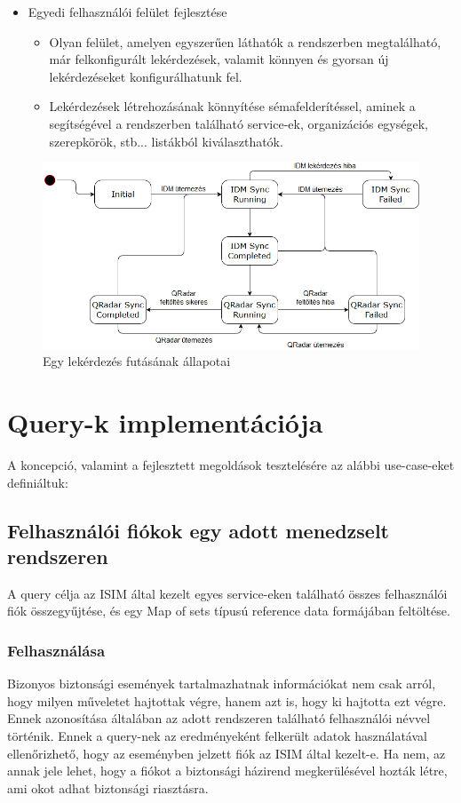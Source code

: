 \begin{itemize}
	\item Egyedi felhasználói felület fejlesztése
	\begin{itemize}
		\item Olyan felület, amelyen egyszerűen láthatók a rendszerben megtalálható, már felkonfigurált lekérdezések, valamit könnyen és gyorsan új lekérdezéseket konfigurálhatunk fel.
		\item Lekérdezések létrehozásának könnyítése sémafelderítéssel, aminek a segítségével a rendszerben található service-ek, organizációs egységek, szerepkörök, stb... listákból kiválaszthatók.
	\end{itemize}
\end{itemize}

\begin{figure}
	\centering
	\includegraphics[width=0.9\linewidth]{figures/refloader_states}
	\caption{Egy lekérdezés futásának állapotai}
	\label{fig:refloaderstates}
\end{figure}


\section{Query-k implementációja} \label{sec:queryk}

A koncepció, valamint a fejlesztett megoldások tesztelésére az alábbi use-case-eket definiáltuk:

\subsection{Felhasználói fiókok egy adott menedzselt rendszeren}
	A query célja az ISIM által kezelt egyes service-eken található összes felhasználói fiók összegyűjtése, és egy Map of sets típusú reference data formájában feltöltése. 
	\subsubsection{Felhasználása} 
		Bizonyos biztonsági események tartalmazhatnak információkat nem csak arról, hogy milyen műveletet hajtottak végre, hanem azt is, hogy ki hajtotta ezt végre. Ennek azonosítása általában az adott rendszeren található felhasználói névvel történik. Ennek a query-nek az eredményeként felkerült adatok használatával ellenőrizhető, hogy az eseményben jelzett fiók az ISIM által kezelt-e. Ha nem, az annak jele lehet, hogy a fiókot a biztonsági házirend megkerülésével hozták létre, ami okot adhat biztonsági riasztásra.
		 
